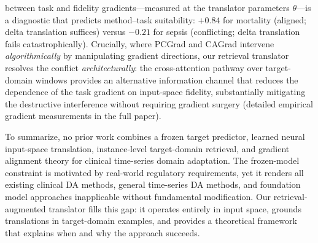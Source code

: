 between task and fidelity gradients---measured at the translator parameters $\theta$---is
a diagnostic that predicts method--task suitability:
$+0.84$ for mortality (aligned; delta translation suffices) versus $-0.21$ for sepsis
(conflicting; delta translation fails catastrophically).
Crucially, where PCGrad and CAGrad intervene \emph{algorithmically} by manipulating gradient
directions, our retrieval translator resolves the conflict \emph{architecturally}: the
cross-attention pathway over target-domain windows provides an alternative information
channel that reduces the dependence of the task gradient on input-space fidelity,
substantially mitigating the destructive interference without requiring gradient surgery
(detailed empirical gradient measurements in the full paper).

\medskip
\noindent
To summarize, no prior work combines a frozen target predictor, learned neural input-space
translation, instance-level target-domain retrieval, and gradient alignment theory for
clinical time-series domain adaptation.
The frozen-model constraint is motivated by real-world regulatory requirements, yet it
renders all existing clinical DA methods, general time-series DA methods, and foundation
model approaches inapplicable without fundamental modification.
Our retrieval-augmented translator fills this gap: it operates entirely in input space,
grounds translations in target-domain examples, and provides a theoretical framework
that explains when and why the approach succeeds.
